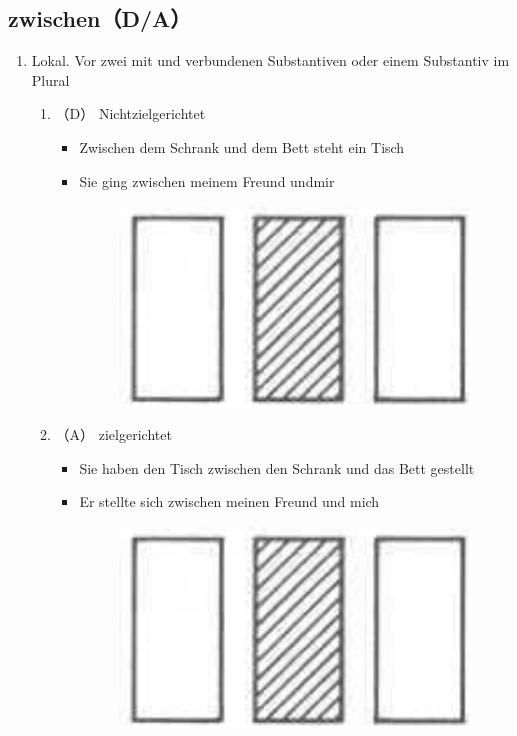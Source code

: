 \documentclass[UTF8]{report}
\begin{document}
\subsection{zwischen（D/A）}
\begin{enumerate}
    \item Lokal. Vor zwei mit und verbundenen Substantiven oder einem Substantiv im Plural
    \begin{enumerate}
        \item（D） Nichtzielgerichtet
        \begin{itemize}
            \item Zwischen dem Schrank und dem Bett steht ein Tisch
            \item Sie ging zwischen meinem Freund undmir
            \begin{figure}[H]
                \centering
                \includegraphics[scale=0.3]{zw1.png}
            \end{figure}
        \end{itemize}
        \item（A） zielgerichtet
        \begin{itemize}
            \item Sie haben den Tisch zwischen den Schrank und das Bett gestellt
            \item Er stellte sich zwischen meinen Freund und mich
            \begin{figure}[H]
                \centering
                \includegraphics[scale=0.3]{zw1.png}

\end{figure}
\end{itemize}
\end{enumerate}
\end{enumerate}
\end{document}
